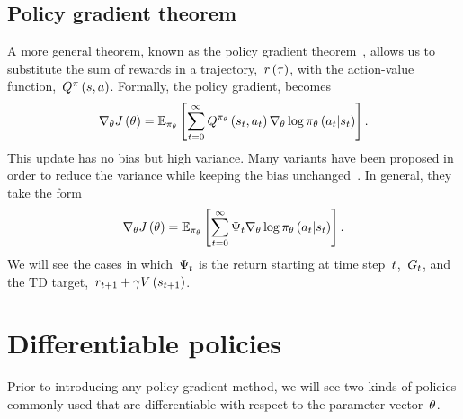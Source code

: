 \subsection{Policy gradient theorem}
A more general theorem, known as the policy gradient theorem~\cite{marbach2001, sutton2000}, allows us to substitute the sum of rewards in a trajectory,~${r\left(\tau\right)}$, with the action-value function,~${\actionvalue\policyscript\left(\state,\action\right)}$. Formally, the policy gradient, becomes
\begin{equation} \label{eq:policy_gradient_theorem}
	\nabla_{\theta}J\left(\theta\right)=\mathbb{E}_{\pi_{\theta}}\left[\sum_{t=0}^{\infty}Q^{\pi_{\theta}}\left(s_{t},a_{t}\right)\nabla_{\theta}\log\pi_{\theta}\left(a_{t}\middle\vert s_{t}\right)\right].
\end{equation}
This update has no bias but high variance. Many variants have been proposed in order to reduce the variance while keeping the bias unchanged~\cite{schulman2015gae}. In general, they take the form
\begin{equation}
	\nabla_{\theta}J\left(\theta\right)=\mathbb{E}_{\pi_{\theta}}\left[\sum_{t=0}^{\infty}\Psi_{t}\nabla_{\theta}\log\pi_{\theta}\left(a_{t}\middle\vert s_{t}\right)\right].
\end{equation}
We will see the cases in which~${\Psi_{t}}$ is the return starting at time step~${t}$,~${G_{t}}$, and the TD target,~${\randomreward_{\timestep+1}+\discount\estimatestatevalue\left(\randomstate_{\timestep+1}\right)}$.

\section{Differentiable policies}
Prior to introducing any policy gradient method, we will see two kinds of policies commonly used that are differentiable with respect to the parameter vector~${\theta}$.

